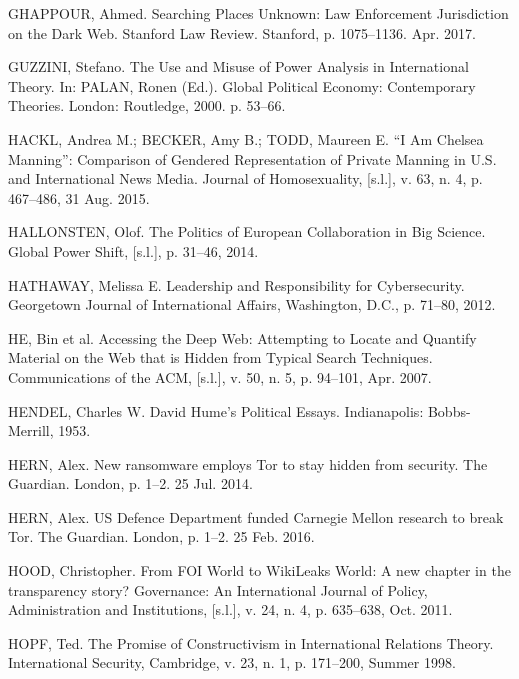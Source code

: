 \begin{list}{}{\setlength{\leftmargin}{0pt}\setlength{\itemsep}{6pt}\setlength{\parsep}{0pt}}
\item GHAPPOUR, Ahmed. Searching Places Unknown: Law Enforcement Jurisdiction on the Dark Web. Stanford Law Review. Stanford, p. 1075--1136. Apr. 2017.

\item GUZZINI, Stefano. The Use and Misuse of Power Analysis in International Theory. In: PALAN, Ronen (Ed.). Global Political Economy: Contemporary Theories. London: Routledge, 2000. p. 53--66.

\item HACKL, Andrea M.; BECKER, Amy B.; TODD, Maureen E. ``I Am Chelsea Manning'': Comparison of Gendered Representation of Private Manning in U.S. and International News Media. Journal of Homosexuality, [s.l.], v. 63, n. 4, p. 467--486, 31 Aug. 2015.

\item HALLONSTEN, Olof. The Politics of European Collaboration in Big Science. Global Power Shift, [s.l.], p. 31--46, 2014.

\item HATHAWAY, Melissa E. Leadership and Responsibility for Cybersecurity. Georgetown Journal of International Affairs, Washington, D.C., p. 71--80, 2012.

\item HE, Bin et al. Accessing the Deep Web: Attempting to Locate and Quantify Material on the Web that is Hidden from Typical Search Techniques. Communications of the ACM, [s.l.], v. 50, n. 5, p. 94--101, Apr. 2007.

\item HENDEL, Charles W. David Hume's Political Essays. Indianapolis: Bobbs-Merrill, 1953.

\item HERN, Alex. New ransomware employs Tor to stay hidden from security. The Guardian. London, p. 1--2. 25 Jul. 2014.

\item HERN, Alex. US Defence Department funded Carnegie Mellon research to break Tor. The Guardian. London, p. 1--2. 25 Feb. 2016.

\item HOOD, Christopher. From FOI World to WikiLeaks World: A new chapter in the transparency story? Governance: An International Journal of Policy, Administration and Institutions, [s.l.], v. 24, n. 4, p. 635--638, Oct. 2011.

\item HOPF, Ted. The Promise of Constructivism in International Relations Theory. International Security, Cambridge, v. 23, n. 1, p. 171--200, Summer 1998.


\end{list}
